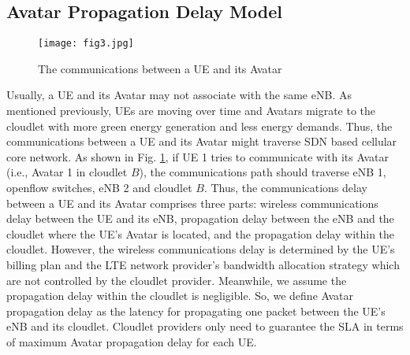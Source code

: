 \documentclass[journal,12pt,draftclsnofoot,onecolumn]{IEEEtran}
\begin{document}
	\subsection{Avatar Propagation Delay Model}
	\begin{figure}[!htb]
		\centering	
\texttt{[image: fig3.jpg]}
		\caption{The communications between a UE and its Avatar}
		
		\label{fig3}
	\end{figure}
	Usually, a UE and its Avatar may not associate with the same eNB. As mentioned previously, UEs are moving over time and Avatars migrate to the cloudlet with more green energy generation and less energy demands. Thus, the communications between a UE and its Avatar might traverse SDN based cellular core network. As shown in Fig. \ref{fig3}, if UE 1 tries to communicate with its Avatar (i.e., Avatar 1 in cloudlet $B$), the communications path should traverse eNB 1, openflow switches, eNB 2 and cloudlet $B$. Thus, the communications delay between a UE and its Avatar comprises three parts: wireless communications delay between the UE and its eNB, propagation delay between the eNB and the cloudlet where the UE's Avatar is located, and the propagation delay within the cloudlet. However, the wireless communications delay is determined by the UE's billing plan and the LTE network provider's bandwidth allocation strategy which are not controlled by the cloudlet provider. Meanwhile, we assume the propagation delay within the cloudlet is negligible. So, we define Avatar propagation delay as the latency for propagating one packet between the UE's eNB and its cloudlet. Cloudlet providers only need to guarantee the SLA in terms of maximum Avatar propagation delay for each UE.\
		
\end{document}
